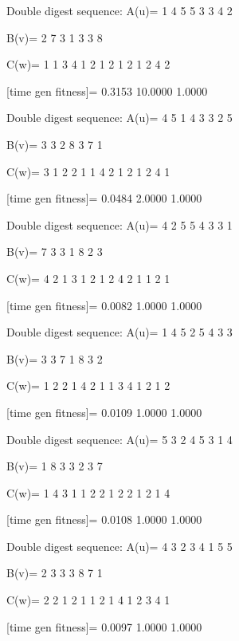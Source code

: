 Double digest sequence:
A(u)=
     1     4     5     5     3     3     4     2

B(v)=
     2     7     3     1     3     3     8

C(w)=
     1     1     3     4     1     2     1     2     1     2     1     2     4     2

[time gen fitness]=
    0.3153   10.0000    1.0000

Double digest sequence:
A(u)=
     4     5     1     4     3     3     2     5

B(v)=
     3     3     2     8     3     7     1

C(w)=
     3     1     2     2     1     1     4     2     1     2     1     2     4     1

[time gen fitness]=
    0.0484    2.0000    1.0000

Double digest sequence:
A(u)=
     4     2     5     5     4     3     3     1

B(v)=
     7     3     3     1     8     2     3

C(w)=
     4     2     1     3     1     2     1     2     4     2     1     1     2     1

[time gen fitness]=
    0.0082    1.0000    1.0000

Double digest sequence:
A(u)=
     1     4     5     2     5     4     3     3

B(v)=
     3     3     7     1     8     3     2

C(w)=
     1     2     2     1     4     2     1     1     3     4     1     2     1     2

[time gen fitness]=
    0.0109    1.0000    1.0000

Double digest sequence:
A(u)=
     5     3     2     4     5     3     1     4

B(v)=
     1     8     3     3     2     3     7

C(w)=
     1     4     3     1     1     2     2     1     2     2     1     2     1     4

[time gen fitness]=
    0.0108    1.0000    1.0000

Double digest sequence:
A(u)=
     4     3     2     3     4     1     5     5

B(v)=
     2     3     3     3     8     7     1

C(w)=
     2     2     1     2     1     1     2     1     4     1     2     3     4     1

[time gen fitness]=
    0.0097    1.0000    1.0000

